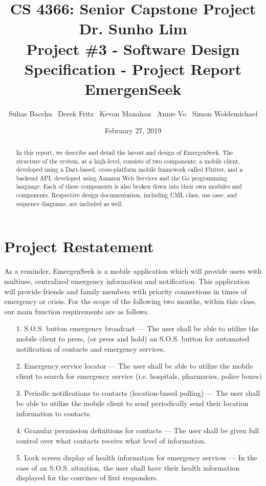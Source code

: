 \documentclass[10pt, a4paper]{article}
\title{\large CS 4366: Senior Capstone Project \\ Dr. Sunho Lim \\ Project \#3 - Software Design Specification - Project Report \\ EmergenSeek}
\author{Suhas Bacchu \ Derek Fritz \ Kevon Manahan \ Annie Vo \ Simon Woldemichael}
\date{February 27, 2019}
\begin{document}
\maketitle
\vspace{-1cm}
\begin{abstract}
In this report, we describe and detail the layout and design of EmergenSeek. The structure of the system, at a high-level, consists of two components; a mobile client, developed using a Dart-based, cross-platform mobile framework called Flutter, and a backend API, developed using Amazon Web Services and the Go programming language. Each of these components is also broken down into their own modules and components. Respective design documentation, including UML class, use case, and sequence diagrams, are included as well.
\end{abstract}

\section{Project Restatement}
As a reminder, EmergenSeek is a mobile application which will provide users with multiuse, centralized emergency information and notification. This application will provide friends and family members with priority connections in times of emergency or crisis. For the scope of the following two months, within this class, our main function requirements are as follows.
\begin{enumerate}
	\item[1.] S.O.S. button emergency broadcast --- The user shall be able to utilize the mobile client to press, (or press and hold) an S.O.S. button for automated notification of contacts and emergency services.
	\item[2.] Emergency service locator --- The user shall be able to utilize the mobile client to search for emergency service (i.e. hospitals, pharmacies, police boxes)
	\item[3.] Periodic notifications to contacts (location-based polling) --- The user shall be able to utilize the mobile client to send periodically send their location information to contacts.
	\item[4.] Granular permission definitions for contacts --- The user shall be given full control over what contacts receive what level of information.
	\item[5.] Lock screen display of health information for emergency services --- In the case of an S.O.S. situation, the user shall have their health information displayed for the convince of first responders.
\end{enumerate}
\end{document}
